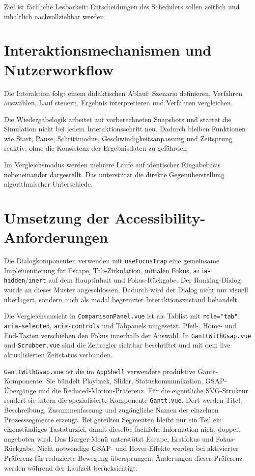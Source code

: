 Ziel ist fachliche Lesbarkeit: Entscheidungen des Schedulers sollen zeitlich und inhaltlich nachvollziehbar werden.

\section{Interaktionsmechanismen und Nutzerworkflow}

Die Interaktion folgt einem didaktischen Ablauf: Szenario definieren, Verfahren auswählen, Lauf steuern, Ergebnis interpretieren und Verfahren vergleichen.

Die Wiedergabelogik arbeitet auf vorberechneten Snapshots und startet die Simulation nicht bei jedem Interaktionsschritt neu. Dadurch bleiben Funktionen wie Start, Pause, Schrittmodus, Geschwindigkeitsanpassung und Zeitsprung reaktiv, ohne die Konsistenz der Ergebnisdaten zu gefährden.

Im Vergleichsmodus werden mehrere Läufe auf identischer Eingabebasis nebeneinander dargestellt. Das unterstützt die direkte Gegenüberstellung algorithmischer Unterschiede.

\section{Umsetzung der Accessibility-Anforderungen}

Die Dialogkomponenten verwenden mit \texttt{useFocusTrap} eine gemeinsame Implementierung für Escape, Tab-Zirkulation, initialen Fokus, \texttt{aria-hidden}/\texttt{inert} auf dem Hauptinhalt und Fokus-Rückgabe. Der Ranking-Dialog wurde an dieses Muster angeschlossen. Dadurch wird der Dialog nicht nur visuell überlagert, sondern auch als modal begrenzter Interaktionszustand behandelt.

Die Vergleichsansicht in \texttt{ComparisonPanel.vue} ist als Tablist mit \texttt{role="tab"}, \texttt{aria-selected}, \texttt{aria-controls} und Tabpanels umgesetzt. Pfeil-, Home- und End-Tasten verschieben den Fokus innerhalb der Auswahl. In \texttt{GanttWithGsap.vue} und \texttt{Scrubber.vue} sind die Zeitregler sichtbar beschriftet und mit dem live aktualisierten Zeitstatus verbunden.

\texttt{GanttWithGsap.vue} ist die im \texttt{AppShell} verwendete produktive Gantt-Komponente. Sie bündelt Playback, Slider, Statuskommunikation, GSAP-Übergänge und die Reduced-Motion-Präferenz. Für die eigentliche SVG-Struktur rendert sie intern die spezialisierte Komponente \texttt{Gantt.vue}. Dort werden Titel, Beschreibung, Zusammenfassung und zugängliche Namen der einzelnen Prozesssegmente erzeugt. Bei geteilten Segmenten bleibt nur ein Teil ein eigenständiges Tastaturziel, damit dieselbe fachliche Information nicht doppelt angeboten wird. Das Burger-Menü unterstützt Escape, Erstfokus und Fokus-Rückgabe. Nicht notwendige GSAP- und Hover-Effekte werden bei aktivierter Präferenz für reduzierte Bewegung übersprungen; Änderungen dieser Präferenz werden während der Laufzeit berücksichtigt.

